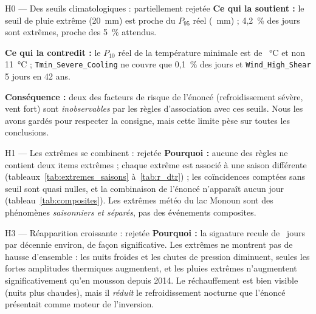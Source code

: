 \documentclass[12pt, a4paper]{article}
\newcommand{\itm}[1]{\texttt{#1}}
\begin{document}
\begin{hypothese}{H0 — Des seuils climatologiques : partiellement rejetée}
\textbf{Ce qui la soutient :} le seuil de pluie extrême (20~mm) est proche du $P_{95}$ réel
(\PnfRain~mm) ; 4,2~\% des jours sont extrêmes, proche des 5~\% attendus.

\textbf{Ce qui la contredit :} le $P_{10}$ réel de la température minimale est de
\PdixTmin~°C et non 11~°C ; \itm{Tmin\_Severe\_Cooling} ne couvre que 0,1~\% des jours et
\itm{Wind\_High\_Shear} 5 jours en 42 ans.

\textbf{Conséquence :} deux des facteurs de risque de l'énoncé (refroidissement sévère, vent
fort) sont \emph{inobservables} par les règles d'association avec ces seuils. Nous les avons
gardés pour respecter la consigne, mais cette limite pèse sur toutes les conclusions.
\end{hypothese}

\begin{hypothese}{H1 — Les extrêmes se combinent : rejetée}
\textbf{Pourquoi :} aucune des \NreglesBrutes{} règles ne contient deux items extrêmes ; chaque
extrême est associé à une saison différente (tableaux~\ref{tab:extremes_saisons}
à~\ref{tab:r_dtr}) ; les coïncidences comptées sans seuil sont quasi nulles, et la combinaison
de l'énoncé n'apparaît aucun jour (tableau~\ref{tab:composites}). Les extrêmes météo du lac
Monoun sont des phénomènes \emph{saisonniers et séparés}, pas des événements composites.
\end{hypothese}


\begin{hypothese}{H3 — Réapparition croissante : rejetée}
\textbf{Pourquoi :} la signature recule de \sigPenteAbs~jours par décennie environ, de façon
significative. Les extrêmes ne montrent pas de hausse d'ensemble : les nuits froides et les
chutes de pression diminuent, seules les fortes amplitudes thermiques augmentent, et les pluies
extrêmes n'augmentent significativement qu'en mousson depuis 2014. Le réchauffement est bien
visible (nuits plus chaudes), mais il \emph{réduit} le refroidissement nocturne que l'énoncé
présentait comme moteur de l'inversion.
\end{hypothese}
\end{document}

